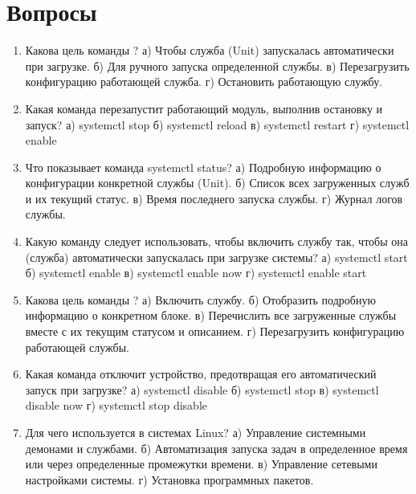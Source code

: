 \documentclass[letterpaper,10pt,russian]{sphinxmanual}
\begin{document}
\section{Вопросы}
\label{\detokenize{educational_materials/managers/quiz:id1}}\label{\detokenize{educational_materials/managers/quiz::doc}}\begin{enumerate}
%
\item {} 
\sphinxAtStartPar
Какова цель команды ?
а) Чтобы служба (Unit) запускалась автоматически при загрузке.
б) Для ручного запуска определенной службы.
в) Перезагрузить конфигурацию работающей служба.
г) Остановить работающую службу.

\item {} 
\sphinxAtStartPar
Какая команда перезапустит работающий модуль, выполнив остановку и запуск?
а) systemctl stop
б) systemctl reload
в) systemctl restart
г) systemctl enable

\item {} 
\sphinxAtStartPar
Что показывает команда systemctl status?
а) Подробную информацию о конфигурации конкретной службы (Unit).
б) Список всех загруженных служб и их текущий статус.
в) Время последнего запуска службы.
г) Журнал логов службы.

\item {} 
\sphinxAtStartPar
Какую команду следует использовать, чтобы включить службу так, чтобы она (служба) автоматически запускалась при загрузке системы?
а) systemctl start
б) systemctl enable
в) systemctl enable \textendash{}now
г) systemctl enable \textendash{}start

\item {} 
\sphinxAtStartPar
Какова цель команды ?
а) Включить службу.
б) Отобразить подробную информацию о конкретном блоке.
в) Перечислить все загруженные службы вместе с их текущим статусом и описанием.
г) Перезагрузить конфигурацию работающей службы.

\item {} 
\sphinxAtStartPar
Какая команда отключит устройство, предотвращая его автоматический запуск при загрузке?
а) systemctl disable
б) systemctl stop
в) systemctl disable \textendash{}now
г) systemctl stop \textendash{}disable

\item {} 
\sphinxAtStartPar
Для чего используется  в системах Linux?
а) Управление системными демонами и службами.
б) Автоматизация запуска задач в определенное время или через определенные промежутки времени.
в) Управление сетевыми настройками системы.
г) Установка программных пакетов.


\end{enumerate}
\end{document}

